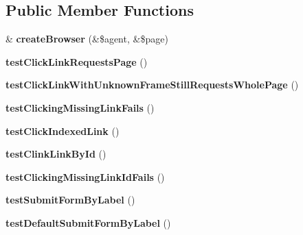 \subsection*{Public Member Functions}
\begin{DoxyCompactItemize}
\item 
\hypertarget{class_test_of_browser_navigation_a25e7459146def3b8dbfe960f423dc284}{
\& {\bfseries createBrowser} (\&\$agent, \&\$page)}
\label{class_test_of_browser_navigation_a25e7459146def3b8dbfe960f423dc284}

\item 
\hypertarget{class_test_of_browser_navigation_a10a763d493e5b594fc18d2a8f529853f}{
{\bfseries testClickLinkRequestsPage} ()}
\label{class_test_of_browser_navigation_a10a763d493e5b594fc18d2a8f529853f}

\item 
\hypertarget{class_test_of_browser_navigation_a6e02444212d390a6ebc35c8f3a586126}{
{\bfseries testClickLinkWithUnknownFrameStillRequestsWholePage} ()}
\label{class_test_of_browser_navigation_a6e02444212d390a6ebc35c8f3a586126}

\item 
\hypertarget{class_test_of_browser_navigation_accbcb7b7300ac2598e531aba9a4e8ea4}{
{\bfseries testClickingMissingLinkFails} ()}
\label{class_test_of_browser_navigation_accbcb7b7300ac2598e531aba9a4e8ea4}

\item 
\hypertarget{class_test_of_browser_navigation_a7b75e2633efcd56c766096809dc08ff5}{
{\bfseries testClickIndexedLink} ()}
\label{class_test_of_browser_navigation_a7b75e2633efcd56c766096809dc08ff5}

\item 
\hypertarget{class_test_of_browser_navigation_a4de1a560a1d41a495f3964014915b461}{
{\bfseries testClinkLinkById} ()}
\label{class_test_of_browser_navigation_a4de1a560a1d41a495f3964014915b461}

\item 
\hypertarget{class_test_of_browser_navigation_a1c3625fc153965a7032e0e0b6f666050}{
{\bfseries testClickingMissingLinkIdFails} ()}
\label{class_test_of_browser_navigation_a1c3625fc153965a7032e0e0b6f666050}

\item 
\hypertarget{class_test_of_browser_navigation_acf3425e90605e5f0592cfa054f75afa5}{
{\bfseries testSubmitFormByLabel} ()}
\label{class_test_of_browser_navigation_acf3425e90605e5f0592cfa054f75afa5}

\item 
\hypertarget{class_test_of_browser_navigation_ab5362aa03be0a50218ddf65e78812c49}{
{\bfseries testDefaultSubmitFormByLabel} ()}
\label{class_test_of_browser_navigation_ab5362aa03be0a50218ddf65e78812c49}


\end{DoxyCompactItemize}
